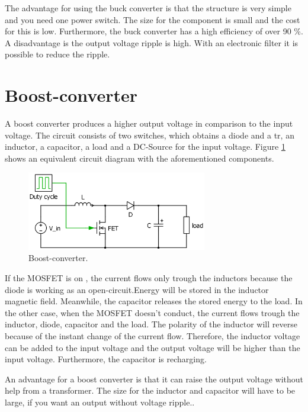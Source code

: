 The advantage for using the buck converter is that the structure is very simple and you need one power switch. The size for the component is small and the cost for this is low. Furthermore, the buck converter has a high efficiency of over 90 \%\cite{datasheetbuck}. A disadvantage  is the output voltage ripple is high. With an electronic filter it is possible to reduce the ripple\cite{advantagebuck}.

\section{Boost-converter\label{Boost-C}}

A boost converter produces a higher output voltage in comparison to the input voltage. The circuit consists of two switches, which obtains a diode and a tr, an inductor, a capacitor, a load and a DC-Source for the input voltage. Figure \ref{Boost-converter} shows an equivalent circuit diagram with the aforementioned components. %

\begin{figure}[htbp]
	\begin{center}
		\includegraphics[width=0.7\textwidth]{../Pictures/Boost-converter}
		\caption{Boost-converter.}
		\label{Boost-converter}
	\end{center}	
\end{figure}

If the MOSFET is on , the current flows only trough the inductors because the diode  is working as an open-circuit.Energy will be stored in the inductor magnetic field. Meanwhile, the capacitor releases the stored energy to the load.%
In the other case, when the MOSFET doesn’t conduct, the current flows trough the inductor, diode, capacitor and the load. The polarity of the inductor will reverse because of the instant change of the current flow.%
Therefore, the inductor voltage can be added to the input voltage and the output voltage will be higher than the input voltage. Furthermore, the capacitor is recharging\cite{schematicbuckandboost}.

An advantage for a boost converter is that it can raise the output voltage without help from a transformer. The size for the inductor and capacitor will have to be large, if you want an output without voltage ripple.\cite{advantageboost}. %
 
